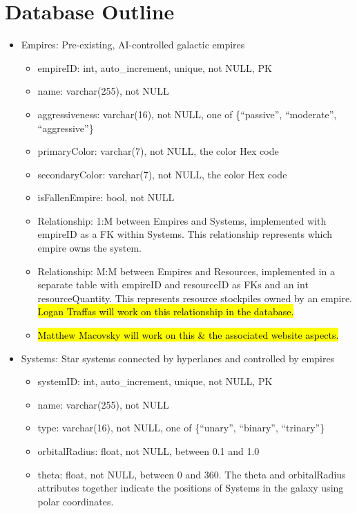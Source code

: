 \documentclass[12pt]{article}
\begin{document}
\newpage
\section{Database Outline}

\begin{itemize}
    \item Empires: Pre-existing, AI-controlled galactic empires
    \begin{itemize}
        \item empireID: int, auto\_increment, unique, not NULL, PK
        \item name: varchar(255), not NULL
        \item aggressiveness: varchar(16), not NULL, one of \{“passive”, “moderate”, “aggressive”\}
        \item primaryColor: varchar(7), not NULL, the color Hex code
        \item secondaryColor: varchar(7), not NULL, the color Hex code
        \item isFallenEmpire: bool, not NULL
        \item Relationship: 1:M between Empires and Systems, implemented with empireID as a FK within Systems. This relationship represents which empire owns the system.
        \item Relationship: M:M between Empires and Resources, implemented in a separate table with empireID and resourceID as FKs and an int resourceQuantity. This represents resource stockpiles owned by an empire. \hl{Logan Traffas will work  on this relationship in the database.}
        \item \hl{Matthew Macovsky will work on this \& the associated website aspects.}
    \end{itemize}
    \item Systems: Star systems connected by hyperlanes and controlled by empires
    \begin{itemize}
        \item systemID: int, auto\_increment, unique, not NULL, PK
        \item name: varchar(255), not NULL
        \item type: varchar(16), not NULL, one of \{“unary”, “binary”, “trinary”\}
        \item orbitalRadius: float, not NULL, between 0.1 and 1.0
        \item theta: float, not NULL, between 0 and 360. The theta and orbitalRadius attributes together indicate the positions of Systems in the galaxy using polar coordinates.

\end{itemize}
\end{itemize}
\end{document}
